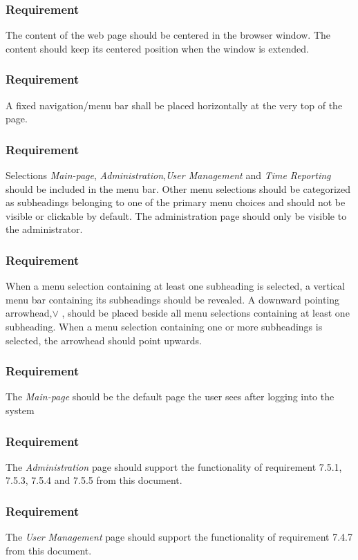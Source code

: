 \documentclass{article}
\begin{document}
\subsubsection{Requirement}
The content of the web page should be centered in the browser window.
The content should keep its centered position when the window is extended.
\subsubsection{Requirement}
A fixed navigation/menu bar shall be placed horizontally at the very top
of the page.
\subsubsection{Requirement}
Selections \textit{Main-page}, \textit{Administration},\textit{User Management} and \textit{Time Reporting} 
should be included in the menu bar. Other menu selections
should be categorized as subheadings belonging to one of the primary
menu choices and should not be visible or clickable by default.
The administration page should only be visible to the administrator.
\subsubsection{Requirement}
When a menu selection containing at least one subheading is selected, a
vertical menu bar containing its subheadings should be revealed.
A downward pointing arrowhead,$\vee$ , should be placed beside all menu selections containing at least one subheading. 
When a menu selection containing one or more subheadings is selected, the arrowhead should point
upwards.

\subsubsection{Requirement}
The \textit{Main-page} should be the default page the user sees after logging into the system

\subsubsection{Requirement}
The \textit{Administration} page should support the functionality of requirement 7.5.1, 7.5.3, 7.5.4 and 7.5.5 from this document.

\subsubsection{Requirement}
The \textit{User Management} page should support the functionality of requirement 7.4.7 from this document.
\end{document}

